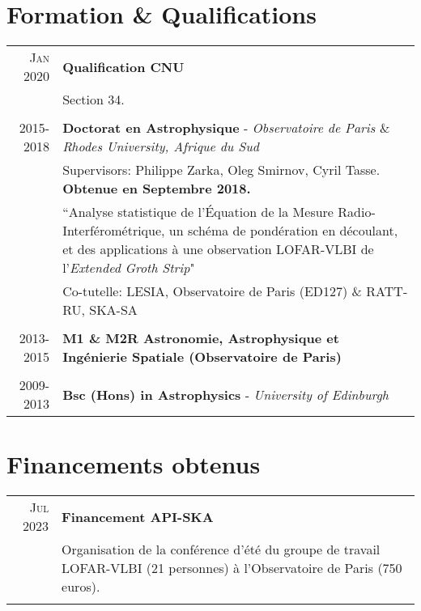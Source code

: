 \section{Formation \& Qualifications}

\begin{tabular}{r|p{15.5cm}}
	\textsc{Jan 2020} & \textbf{Qualification CNU}\\
	& Section 34.\\
	\multicolumn{2}{c}{} \\

\textsc{2015-2018} & \textbf{Doctorat en Astrophysique} - \textit{Observatoire de Paris $\&$ Rhodes University, Afrique du Sud}\\
& Supervisors: Philippe Zarka, Oleg Smirnov, Cyril Tasse. \textbf{Obtenue en Septembre 2018.}\\
& ``Analyse statistique de l’\'Equation de la Mesure Radio-Interférométrique, un schéma de pondération en découlant, et des applications à une observation LOFAR-VLBI de l’\textit{Extended Groth Strip}"\\
& Co-tutelle: LESIA, Observatoire de Paris (ED127) \& RATT-RU, SKA-SA\\
\multicolumn{2}{c}{} \\

\textsc{2013-2015} & \textbf{M1 \& M2R Astronomie, Astrophysique et Ingénierie Spatiale (Observatoire de Paris)} \\
\multicolumn{2}{c}{} \\


\textsc{2009-2013} & \textbf{Bsc (Hons) in Astrophysics} - \textit{University of Edinburgh} \\


\end{tabular}


\section{Financements obtenus}

\begin{tabular}{r|p{15.5cm}}
	\textsc{Jul 2023} & \textbf{Financement API-SKA}\\
	& Organisation de la conf\'erence d'\'et\'e du groupe de travail LOFAR-VLBI (21 personnes) \`a l'Observatoire de Paris (750 euros).\\
	\multicolumn{2}{c}{} \\

\end{tabular}


